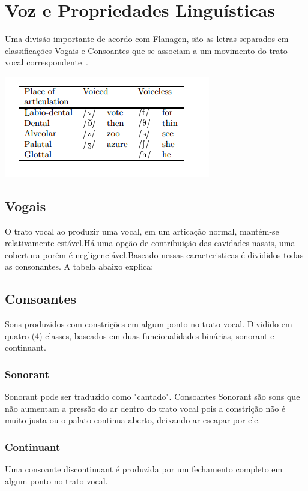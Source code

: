 \section{Voz e Propriedades Linguísticas}
	Uma divisão importante de acordo com Flanagen, são as letras separados em classificações Vogais e Consoantes que se associam a um movimento do trato vocal correspondente~\cite{JFlanagan}.
	
	\includegraphics{tabelaConsoantes.png}
	
	\subsection{Vogais}
	
	O trato vocal ao produzir uma vocal, em um articação normal, mantém-se relativamente estável.Há uma opção de contribuição das cavidades nasais, uma cobertura porém é negligenciável.Baseado nessas caracteristicas é divididos todas as consonantes. A tabela abaixo explica:
	
	
	\subsection{Consoantes}
	Sons produzidos com constrições em algum ponto no trato vocal. Dividido em quatro (4) classes, baseados em duas funcionalidades binárias, sonorant e continuant.
	
	
		\subsubsection{Sonorant}	 
			Sonorant pode ser traduzido como "cantado". Consoantes Sonorant são sons que não aumentam a pressão do ar dentro do trato vocal pois a constrição não é muito justa ou o palato continua aberto, deixando ar escapar por ele.
			
		\subsubsection{Continuant}
			Uma consoante discontinuant é produzida por um fechamento completo em algum ponto no trato vocal.

